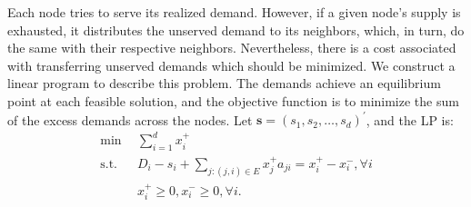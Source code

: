 \documentclass[final,11pt,3p]{article}\usepackage{setspace}
\begin{document}
Each node tries to serve its realized demand. However, if a given node's supply is exhausted, it distributes the unserved demand to its neighbors,
which, in turn, do the same with their respective neighbors. Nevertheless, there is a cost associated with transferring unserved demands which should be minimized. We construct a linear program to describe this problem. The demands achieve an equilibrium point at each feasible solution, and the objective function is to minimize the sum of the excess demands across the nodes. Let $\boldsymbol{s} = (s_{1},s_{2},\dots,s_{d})^{\prime}$, and the LP is:
\begin{align}
\label{original_primal}
\min~~  &  \sum_{i=1}^{d} x_{i}^{+}\nonumber\\
\text{s.t.}~~  &  D_{i} - s_{i} + \sum_{j:(j,i)\in E}x_{j}^{+} a_{ji}=x_{i}^{+}-x_{i}^{-} , \forall i\nonumber\\
&  x_{i}^{+} \ge0, x_{i}^{-} \ge0, \forall i.
\end{align}
\end{document}
